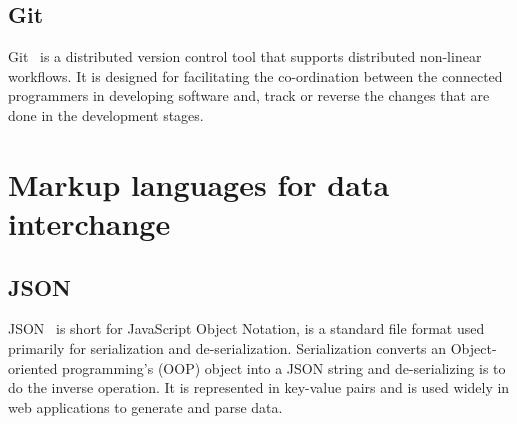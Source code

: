 	\subsection{Git}
		 Git~\cite{Loeliger2012a} is a distributed version control tool that supports distributed non-linear workflows. 
		 It is designed for facilitating the co-ordination between the connected programmers in developing software and, track or reverse the changes that are done in the development stages.
  		
\section{Markup languages for data interchange}
\subsection{JSON}
JSON~\cite{ECMA-404-2013} is short for JavaScript Object Notation, is a standard file format used primarily for serialization and de-serialization.
Serialization converts an Object-oriented programming's (OOP) object into a JSON string and de-serializing is to do the inverse operation.
It is represented in key-value pairs and is used widely in web applications to generate and parse data.
